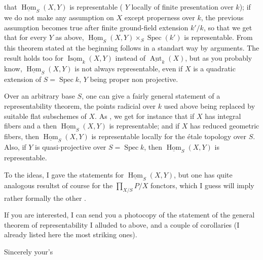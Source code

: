 that $\underline{\operatorname{Hom}}_S(X,Y)$ is representable ( $Y$ locally of finite presentation  over $k$); if we do not make any assumption on $X$ except properness over $k$, the previous assumption becomes true after finite ground-field extension $k'/k$, so that we get that for every $Y$ as above, $\underline{\operatorname{Hom}}_S(X,Y)\times_S\operatorname{Spec}(k')$ is representable. From this  theorem stated at the beginning follows in a standart way by  arguments. The result holds too for $\underline{\operatorname{Isom}}_k(X,Y)$ instead of $\underline{\operatorname{Aut}}_k(X)$, but as you probably know, $\underline{\operatorname{Hom}}_S(X,Y)$ is not always representable, even if $X$ is a quadratic extension of $S=\operatorname{Spec}k$, $Y$ being proper non projective.

Over an arbitrary base $S$, one can give a fairly general statement of a representability theorem, the points radicial over $k$ used above being replaced by suitable flat subschemes of $X$. As  , we get for instance that if $X$ has integral  fibers and a   then $\underline{\operatorname{Hom}}_S(X,Y)$ is representable; and if $X$ has reduced geometric fibers, then $\underline{\operatorname{Hom}}_S(X,Y)$ is representable locally for the étale topology over $S$. Also, if $Y$ is quasi-projective over $S=\operatorname{Spec}k$, then $\underline{\operatorname{Hom}}_S(X,Y)$ is representable.

To  the ideas, I gave the statements for $\underline{\operatorname{Hom}}_S(X,Y)$, but one has quite analogous resultst of course for the $\prod_{X/S}P/X$ fonctors, which I guess will imply rather formally the other .

If you are interested, I can send you a photocopy of the statement of the general theorem of representability I alluded to\unsure{,} above, and a couple of corollaries (I already listed here the most striking ones).

Sincerely your's
